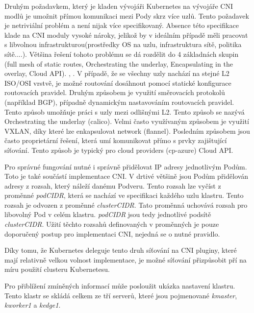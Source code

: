 Druhým požadavkem, který je kladen vývojáři Kubernetes na vývojáře CNI modlů je umožnit přímou komunikaci mezi Pody skrz více uzlů. Tento požadavek je netriviální problém a není nijak více specifikovaný. Absence této specifikace klade na CNI moduly vysoké nároky, jelikož by v ideálním případě měli pracovat s libvolnou infrastrukturou(prostředky OS na uzlu, infrastruktura sítě, politika sítě....). Většina řešení tohoto problému se dá rozdělit do 4 základnách skupin (full mesh of static routes, Orchestrating the underlay, Encapsulating in the overlay, Cloud API). \cite{kashin_2022_cni}, \cite{cncfcloudnativecomputingfoundation_2019_kubernetes}. V případě, že se všechny uzly nachází na stejné L2 ISO/OSI vrstvě, je možné routování dosáhnout pomocí statické konfigurace routovacích pravidel. Druhým způsobem je využití směrovacích protokolů (například BGP), případně dynamickým nastavováním routovacích pravidel. Tento způsob umožňuje práci s uzly mezi odlišnými L2. Tento způsob se nazývá Orchestrating the underlay (calico). Velmi často využívaným způsobem je využití VXLAN, díky které lze enkapsulovat network (flannel). Posledním způsobem jsou často proprietární řešení, která umí komunikovat přímo s prvky zajištující síťování. Tento způsob je typický pro cloud providers (cp-azure) Cloud API.

Pro správné fungování nutné i správně přidělovat IP adresy jednotlivým Podům. Toto je také součástí implementace CNI. V drtivé většině jsou Podům přidělován adresy z rozsah, který náleží danému Podveru. Tento rozsah lze vyčíst z proměnné \textit{podCIDR}, která se nachází ve specifikaci každého uzlu klastru. Tento rozsah je odvozen z proměnné \textit{clusterCIDR}. Tato proměnná uchovává rozsah pro libovolný Pod v celém klastru. \textit{podCIDR} jsou tedy jednotlivé podsítě \textit{clusterCIDR}. Užití těchto rozsahů definovaných v proměnných je pouze doporučený postup pro implementaci CNI, nejedná se o nutné pravidlo. \cite{cncfcloudnativecomputingfoundation_2019_kubernetes}       

Díky tomu, že Kubernetes deleguje tento druh síťování na CNI pluginy, které mají relativně velkou volnost implementace, je možné síťování přizpůsobit pří na míru použití clusteru Kubernetesu.

Pro přiblížení zmíněných informací může posloužit ukázka nastavení klastru. Tento klastr se skládá celkem ze tří serverů, které jsou pojmenované \textit{kmaster}, \textit{kworker1} a \textit{kedge1}. \cite{thekubernetesauthors_2023_kubectl}



